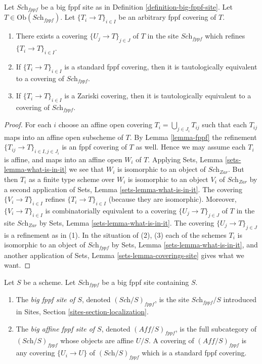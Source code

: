 \begin{lemma}
\label{lemma-fppf-induced}
Let $\textit{Sch}_{fppf}$ be a big fppf site as in
Definition \ref{definition-big-fppf-site}.
Let $T \in \text{Ob}(\textit{Sch}_{fppf})$.
Let $\{T_i \to T\}_{i \in I}$ be an arbitrary fppf covering of $T$.
\begin{enumerate}
\item There exists a covering $\{U_j \to T\}_{j \in J}$ of $T$ in the site
$\textit{Sch}_{fppf}$ which refines $\{T_i \to T\}_{i \in I}$.
\item If $\{T_i \to T\}_{i \in I}$ is a standard fppf covering, then
it is tautologically equivalent to a covering of $\textit{Sch}_{fppf}$.
\item If $\{T_i \to T\}_{i \in I}$ is a Zariski covering, then
it is tautologically equivalent to a covering of $\textit{Sch}_{fppf}$.
\end{enumerate}
\end{lemma}

\begin{proof}
For each $i$ choose an affine open covering $T_i = \bigcup_{j \in J_i} T_{ij}$
such that each $T_{ij}$ maps into an affine open subscheme of $T$. By
Lemma \ref{lemma-fppf}
the refinement $\{T_{ij} \to T\}_{i \in I, j \in J_i}$ is an fppf covering
of $T$ as well. Hence we may assume each $T_i$ is affine, and maps into
an affine open $W_i$ of $T$. Applying
Sets, Lemma \ref{sets-lemma-what-is-in-it}
we see that $W_i$ is isomorphic to an object of $\textit{Sch}_{Zar}$.
But then $T_i$ as a finite type scheme over $W_i$
is isomorphic to an object $V_i$ of $\textit{Sch}_{Zar}$ by a second
application of
Sets, Lemma \ref{sets-lemma-what-is-in-it}.
The covering $\{V_i \to T\}_{i \in I}$ refines $\{T_i \to T\}_{i \in I}$
(because they are isomorphic).
Moreover, $\{V_i \to T\}_{i \in I}$ is combinatorially equivalent to a
covering $\{U_j \to T\}_{j \in J}$ of $T$ in the site
$\textit{Sch}_{Zar}$ by
Sets, Lemma \ref{sets-lemma-what-is-in-it}.
The covering $\{U_j \to T\}_{j \in J}$ is a refinement as in (1).
In the situation of (2), (3) each of the
schemes $T_i$ is isomorphic to an object of $\textit{Sch}_{fppf}$ by
Sets, Lemma \ref{sets-lemma-what-is-in-it},
and another application of
Sets, Lemma \ref{sets-lemma-coverings-site}
gives what we want.
\end{proof}

\begin{definition}
\label{definition-big-small-fppf}
Let $S$ be a scheme. Let $\textit{Sch}_{fppf}$ be a big fppf
site containing $S$.
\begin{enumerate}
\item The {\it big fppf site of $S$}, denoted
$(\textit{Sch}/S)_{fppf}$, is the site $\textit{Sch}_{fppf}/S$
introduced in Sites, Section \ref{sites-section-localization}.
\item The {\it big affine fppf site of $S$}, denoted
$(\textit{Aff}/S)_{fppf}$, is the full subcategory of
$(\textit{Sch}/S)_{fppf}$ whose objects are affine $U/S$.
A covering of $(\textit{Aff}/S)_{fppf}$ is any covering
$\{U_i \to U\}$ of $(\textit{Sch}/S)_{fppf}$ which is a
standard fppf covering.
\end{enumerate}
\end{definition}

